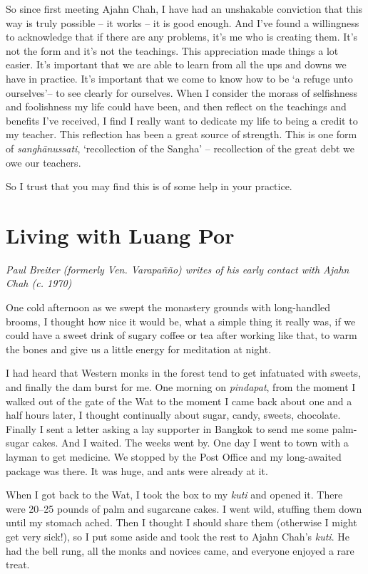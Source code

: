 So since first meeting Ajahn Chah, I have had an unshakable conviction
that this way is truly possible -- it works -- it is good enough. And
I've found a willingness to acknowledge that if there are any problems,
it's me who is creating them. It's not the form and it's not the
teachings. This appreciation made things a lot easier. It's important
that we are able to learn from all the ups and downs we have in
practice. It's important that we come to know how to be `a refuge unto
ourselves'-- to see clearly for ourselves. When I consider the morass of
selfishness and foolishness my life could have been, and then reflect on
the teachings and benefits I've received, I find I really want to
dedicate my life to being a credit to my teacher. This reflection has
been a great source of strength. This is one form of
\emph{sanghānussati}, `recollection of the Sangha' -- recollection of
the great debt we owe our teachers.

So I trust that you may find this is of some help in your practice.

\chapter{Living with Luang Por}

\emph{Paul Breiter (formerly Ven. Varapañño) writes of his early contact with
Ajahn Chah (c. 1970)}

One cold afternoon as we swept the monastery grounds with long-handled
brooms, I thought how nice it would be, what a simple thing it really
was, if we could have a sweet drink of sugary coffee or tea after
working like that, to warm the bones and give us a little energy for
meditation at night.

I had heard that Western monks in the forest tend to get infatuated with
sweets, and finally the dam burst for me. One morning on
\emph{pindapat}, from the moment I walked out of the gate of the Wat to
the moment I came back about one and a half hours later, I thought
continually about sugar, candy, sweets, chocolate. Finally I sent a
letter asking a lay supporter in Bangkok to send me some palm-sugar
cakes. And I waited. The weeks went by. One day I went to town with a
layman to get medicine. We stopped by the Post Office and my
long-awaited package was there. It was huge, and ants were already at
it.

When I got back to the Wat, I took the box to my \emph{kuti} and opened
it. There were 20--25 pounds of palm and sugarcane cakes. I went wild,
stuffing them down until my stomach ached. Then I thought I should share
them (otherwise I might get very sick!), so I put some aside and took
the rest to Ajahn Chah's \emph{kuti}. He had the bell rung, all the
monks and novices came, and everyone enjoyed a rare treat.

